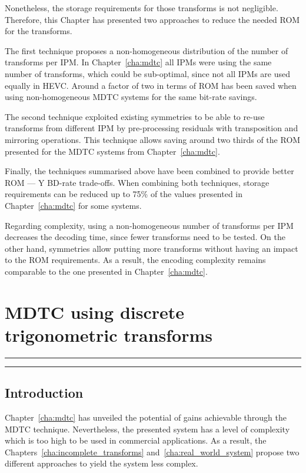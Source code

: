 \documentclass[11pt,a4paper,openright,twoside]{book}
\providecommand{\chaptertoc}{
	\startcontents[chapters]
	\hrule
	\vspace{1em}
	\printcontents[chapters]{}{1}{{\sf\large\bfseries Contents}}
	\vspace{1em}
	\hrule
}
\numberwithin{equation}{section} %
\numberwithin{figure}{section} %
\numberwithin{table}{section} %
\begin{document}
Nonetheless, the storage requirements for those transforms is not negligible.
Therefore, this Chapter has presented two approaches to reduce the needed
\acs{ROM} for the transforms.

The first technique proposes a non-homogeneous distribution of the number of
transforms per \ac{IPM}.
In Chapter~\ref{cha:mdtc} all \acp{IPM} were using the same number of
transforms, which could be sub-optimal, since not all \acp{IPM} are used
equally in \ac{HEVC}.
Around a factor of two in terms of \acs{ROM} has been saved when using
non-homogeneous \ac{MDTC} systems for the same bit-rate savings.

The second technique exploited existing symmetries to be able to re-use
transforms from different \ac{IPM} by pre-processing residuals with
transposition and mirroring operations.
This technique allows saving around two thirds of the \acs{ROM} presented for
the \ac{MDTC} systems from Chapter~\ref{cha:mdtc}.

Finally, the techniques summarised above have been combined to provide better
\acs{ROM} --- Y \ac{BD}-rate trade-offs.
When combining both techniques, storage requirements can be reduced up to 75\%
of the values presented in Chapter~\ref{cha:mdtc} for some systems.

Regarding complexity, using a non-homogeneous number of transforms per
\ac{IPM} decreases the decoding time, since fewer transforms need to be
tested.
On the other hand, symmetries allow putting more transforms without having an
impact to the \acs{ROM} requirements.
As a result, the encoding complexity remains comparable to the one presented
in Chapter~\ref{cha:mdtc}.

\chapter{\acs{MDTC} using discrete trigonometric transforms}
\label{cha:dtt}
\chaptertoc

\section{Introduction}
\label{sec:introduction}

Chapter~\ref{cha:mdtc} has unveiled the potential of gains achievable through
the \ac{MDTC} technique.
Nevertheless, the presented system has a level of complexity which is too
high to be used in commercial applications.
As a result, the Chapters~\ref{cha:incomplete_transforms}
and~\ref{cha:real_world_system} propose two different approaches to yield the
system less complex.
\end{document}

